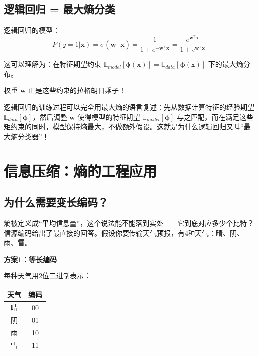 \subsection{逻辑回归 = 最大熵分类}

逻辑回归的模型：
\begin{equation}
P(y=1 | \bm{x}) = \sigma(\bm{w}^\top \bm{x}) = \frac{1}{1 + e^{-\bm{w}^\top \bm{x}}} = \frac{e^{\bm{w}^\top \bm{x}}}{1 + e^{\bm{w}^\top \bm{x}}}
\end{equation}

这可以理解为：在特征期望约束 $\mathbb{E}_{model}[\bm{\phi}(\bm{x})] = \mathbb{E}_{data}[\bm{\phi}(\bm{x})]$ 下的最大熵分布。

权重 $\bm{w}$ 正是这些约束的拉格朗日乘子！

\begin{physicalmeaning}
逻辑回归的训练过程可以完全用最大熵的语言复述：先从数据计算特征的经验期望 $\mathbb{E}_{data}[\bm{\phi}]$，然后调整 $\bm{w}$ 使得模型的特征期望 $\mathbb{E}_{model}[\bm{\phi}]$ 与之匹配，而在满足这些矩约束的同时，模型保持熵最大，不做额外假设。这就是为什么逻辑回归又叫“最大熵分类器”！
\end{physicalmeaning}





\section{信息压缩：熵的工程应用}

\subsection{为什么需要变长编码？}

熵被定义成“平均信息量”，这个说法能不能落到实处——它到底对应多少个比特？信源编码给出了最直接的回答。假设你要传输天气预报，有4种天气：晴、阴、雨、雪。

\textbf{方案1：等长编码}

每种天气用2位二进制表示：
\begin{center}
\begin{tabular}{c|c}
天气 & 编码 \\
\hline
晴 & 00 \\
阴 & 01 \\
雨 & 10 \\
雪 & 11 \\
\end{tabular}
\end{center}

